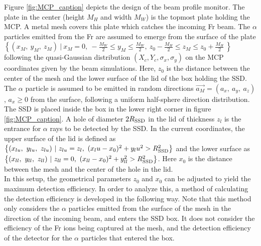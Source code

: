 \documentclass{article}
\begin{document}
Figure \ref{fig:MCP_caption} depicts the design of the beam profile monitor. The plate in the center (height $M_H$ and width $M_W$) is the topmost plate holding the MCP. A metal mesh covers this plate which catches the incoming Fr beam. The $\alpha$ particles emitted from the Fr are assumed to emerge from the surface of the plate $\left\{ (x_M,\ y_M,\ z_M)\ |\ x_M = 0,\ -\frac{M_W}{2} \le y_M \le \frac{M_W}{2},\ z_0-\frac{M_H}{2} \le z_M \le z_0+\frac{M_H}{2}\ \right\}$ following the quasi-Gaussian distribution $(X_c, Y_c, \sigma_x, \sigma_y)$ on the MCP coordinates given by the beam simulations. Here, $z_0$ is the distance between the center of the mesh and the lower surface of the lid of the box holding the SSD. The $\alpha$ particle is assumed to be emitted in random directions $\vec{a_M} = (a_x,\ a_y,\ a_z)$, $a_x \ge 0$ from the surface, following a uniform half-sphere direction distribution. \\

The SSD is placed inside the box in the lower right corner in figure \ref{fig:MCP_caption}. A hole of diameter $2R_{{\rm SSD}}$ in the lid of thickness $z_l$ is the entrance for $\alpha$ rays to be detected by the SSD. In the current coordinates, the upper surface of the lid is defined as $\left\{ (x_{lu},\ y_{lu},\ z_{lu})\ |\ z_{lu} = z_l,\ (x_lu - x_0)^2 + y_lu^2 > R_{{\rm SSD}}^2 \right\}$ and the lower surface as $\left\{ (x_{ll},\ y_{ll},\ z_{ll})\ |\ z_{ll} = 0,\ (x_{ll} - x_0)^2 + y_{ll}^2 > R_{{\rm SSD}}^2 \right\}$. Here $x_0$ is the distance between the mesh and the center of the hole in the lid.\\

In this setup, the geometrical parameters $z_0$ and $x_0$ can be adjusted to yield the maximum detection efficiency. In order to analyze this, a method of calculating the detection efficiency is developed in the following way. Note that this method only considers the $\alpha$ particles emitted from the surface of the mesh in the direction of the incoming beam, and enters the SSD box. It does not consider the efficiency of the Fr ions being captured at the mesh, and the detection efficiency of the detector for the $\alpha$ particles that entered the box.\\
\end{document}
